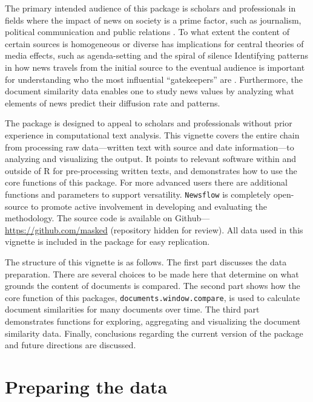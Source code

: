 \documentclass[]{article}
\begin{document}
The primary intended audience of this package is scholars and
professionals in fields where the impact of news on society is a prime
factor, such as journalism, political communication and public relations
\citep{baum08, boczkowski07, ragas14}. To what extent the content of
certain sources is homogeneous or diverse has implications for central
theories of media effects, such as agenda-setting and the spiral of
silence \citep{bennett08, blumler99} Identifying patterns in how news
travels from the initial source to the eventual audience is important
for understanding who the most influential ``gatekeepers'' are
\citep{shoemaker09}. Furthermore, the document similarity data enables
one to study news values \citep{galtung65} by analyzing what elements of
news predict their diffusion rate and patterns.

The package is designed to appeal to scholars and professionals without
prior experience in computational text analysis. This vignette covers
the entire chain from processing raw data---written text with source and
date information---to analyzing and visualizing the output. It points to
relevant software within and outside of R for pre-processing written
texts, and demonstrates how to use the core functions of this package.
For more advanced users there are additional functions and parameters to
support versatility. \texttt{Newsflow} is completely open-source to
promote active involvement in developing and evaluating the methodology.
The source code is available on Github---\url{https://github.com/masked}
(repository hidden for review). All data used in this vignette is
included in the package for easy replication.

The structure of this vignette is as follows. The first part discusses
the data preparation. There are several choices to be made here that
determine on what grounds the content of documents is compared. The
second part shows how the core function of this packages,
\texttt{documents.window.compare}, is used to calculate document
similarities for many documents over time. The third part demonstrates
functions for exploring, aggregating and visualizing the document
similarity data. Finally, conclusions regarding the current version of
the package and future directions are discussed.

\section{Preparing the data}\label{preparing-the-data}
\end{document}
